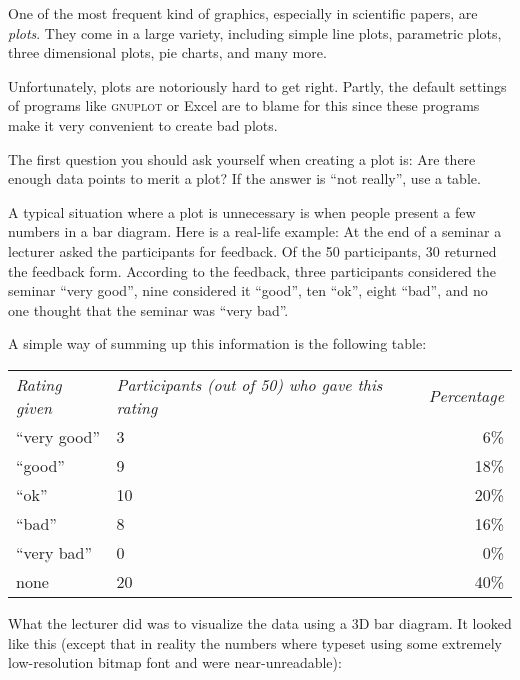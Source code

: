 One of the most frequent kind of graphics, especially in scientific papers, are
\emph{plots}. They come in a large variety, including simple line plots,
parametric plots, three dimensional plots, pie charts, and many more.

Unfortunately, plots are notoriously hard to get right. Partly, the default
settings of programs like \textsc{gnuplot} or Excel are to blame for this since
these programs make it very convenient to create bad plots.

The first question you should ask yourself when creating a plot is: Are there
enough data points to merit a plot? If the answer is ``not really'', use a
table.

A typical situation where a plot is unnecessary is when people present a few
numbers in a bar diagram. Here is a real-life example: At the end of a seminar
a lecturer asked the participants for feedback. Of the 50 participants, 30
returned the feedback form. According to the feedback, three participants
considered the seminar ``very good'', nine considered it ``good'', ten ``ok'',
eight ``bad'', and no one thought that the seminar was ``very bad''.

A simple way of summing up this information is the following table:

\medskip
\begin{tabular}{lp{3.75cm}r}
  \emph{Rating given} & \raggedright\emph{Participants (out of 50) who gave this rating} &
  \emph{Percentage} \\[1.75em]
  ``very good'' & \hfil\hphantom{0}3\hfil & \hphantom{0}6\% \\
  ``good'' & \hfil\hphantom{0}9\hfil & 18\% \\
  ``ok'' & \hfil10\hfil & 20\% \\
  ``bad'' & \hfil\hphantom{0}8\hfil & 16\% \\
  ``very bad'' & \hfil\hphantom{0}0\hfil & \hphantom{0}0\% \\[2mm]
  none & \hfil20\hfil & 40\% \\
\end{tabular}

\bigskip
What the lecturer did was to visualize the data using a 3D bar diagram. It
looked like this (except that in reality the numbers where typeset using some
extremely low-resolution bitmap font and were near-unreadable):

